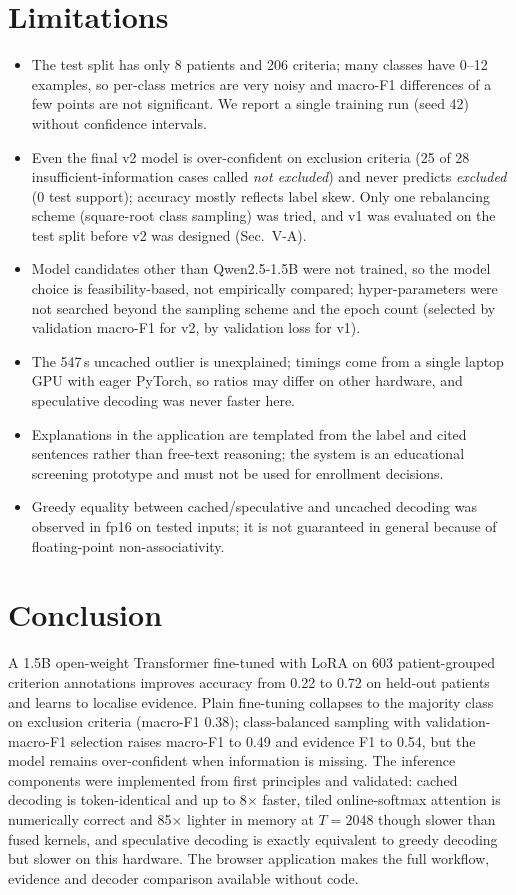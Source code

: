 \documentclass[conference]{IEEEtran}
\begin{document}
\section{Limitations}
\begin{itemize}
\item The test split has only 8 patients and 206 criteria; many classes have 0--12 examples, so per-class metrics are very noisy and macro-F1 differences of a few points are not significant. We report a single training run (seed 42) without confidence intervals.
\item Even the final v2 model is over-confident on exclusion criteria (25 of 28 insufficient-information cases called \emph{not excluded}) and never predicts \emph{excluded} (0 test support); accuracy mostly reflects label skew. Only one rebalancing scheme (square-root class sampling) was tried, and v1 was evaluated on the test split before v2 was designed (Sec.~V-A).
\item Model candidates other than Qwen2.5-1.5B were not trained, so the model choice is feasibility-based, not empirically compared; hyper-parameters were not searched beyond the sampling scheme and the epoch count (selected by validation macro-F1 for v2, by validation loss for v1).
\item The 547\,s uncached outlier is unexplained; timings come from a single laptop GPU with eager PyTorch, so ratios may differ on other hardware, and speculative decoding was never faster here.
\item Explanations in the application are templated from the label and cited sentences rather than free-text reasoning; the system is an educational screening prototype and must not be used for enrollment decisions.
\item Greedy equality between cached/speculative and uncached decoding was observed in fp16 on tested inputs; it is not guaranteed in general because of floating-point non-associativity.
\end{itemize}

\section{Conclusion}
A 1.5B open-weight Transformer fine-tuned with LoRA on 603 patient-grouped criterion annotations improves accuracy from 0.22 to 0.72 on held-out patients and learns to localise evidence. Plain fine-tuning collapses to the majority class on exclusion criteria (macro-F1 0.38); class-balanced sampling with validation-macro-F1 selection raises macro-F1 to 0.49 and evidence F1 to 0.54, but the model remains over-confident when information is missing. The inference components were implemented from first principles and validated: cached decoding is token-identical and up to 8$\times$ faster, tiled online-softmax attention is numerically correct and 85$\times$ lighter in memory at $T=2048$ though slower than fused kernels, and speculative decoding is exactly equivalent to greedy decoding but slower on this hardware. The browser application makes the full workflow, evidence and decoder comparison available without code.
\end{document}
